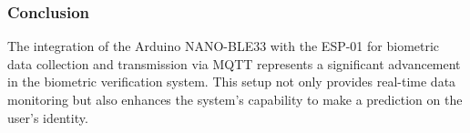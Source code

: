 \subsubsection{Conclusion}
The integration of the Arduino NANO-BLE33 with the ESP-01 for biometric data collection and transmission via MQTT represents a significant advancement in the biometric verification system. This setup not only provides real-time data monitoring but also enhances the system's capability to make a prediction on the user's identity.
